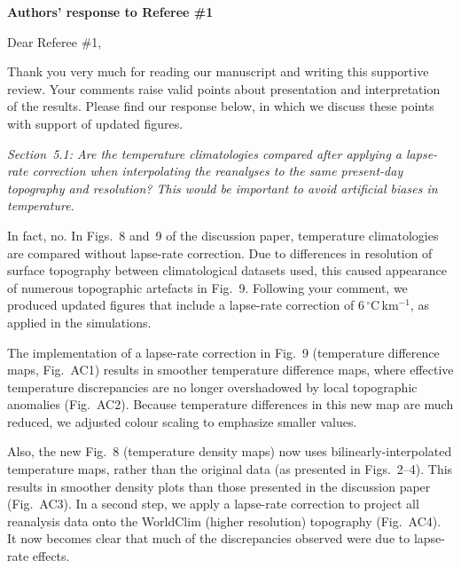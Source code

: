 \documentclass[10pt]{article}
\begin{document}
\textbf{Authors' response to Referee {\#}1}
\bigskip


\renewcommand\thefigure{AC\arabic{figure}}
\def\referee#1{\bigskip\textcolor{journalname}{\textit{#1}}}
\def\msquote#1{\begin{quote}\textit{#1}\end{quote}}

Dear Referee {\#}1,

Thank you very much for reading our manuscript and writing this supportive review. Your comments raise valid points about presentation and interpretation of the results. Please find our response below, in which we discuss these points with support of updated figures.

\referee{Section~5.1: Are the temperature climatologies compared after applying a lapse-rate correction when interpolating the reanalyses to the same present-day topography and resolution? This would be important to avoid artificial biases in temperature.}

In fact, no. In Figs.~8 and~9 of the discussion paper, temperature climatologies are compared without lapse-rate correction. Due to differences in resolution of surface topography between climatological datasets used, this caused appearance of numerous topographic artefacts in Fig.~9. Following your comment, we produced updated figures that include a lapse-rate correction of 6\,{$^\circ$}C\,km$^{-1}$, as applied in the simulations.

The implementation of a lapse-rate correction in Fig.~9 (temperature difference maps, Fig.~AC1) results in smoother temperature difference maps, where effective temperature discrepancies are no longer overshadowed by local topographic anomalies (Fig.~AC2). Because temperature differences in this new map are much reduced, we adjusted colour scaling to emphasize smaller values.

Also, the new Fig.~8 (temperature density maps) now uses bilinearly-interpolated temperature maps, rather than the original data (as presented in Figs.~2--4). This results in smoother density plots than those presented in the discussion paper (Fig.~AC3). In a second step, we apply a lapse-rate correction to project all reanalysis data onto the WorldClim (higher resolution) topography (Fig.~AC4). It now becomes clear that much of the discrepancies observed were due to lapse-rate effects.
\end{document}
